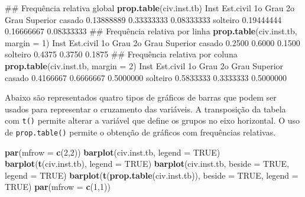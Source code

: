 \documentclass[10pt,a4paper]{book}
\newenvironment{Shaded}{\begin{snugshade}}{\end{snugshade}}
\newcommand{\KeywordTok}[1]{\textcolor[rgb]{0.13,0.29,0.53}{\textbf{#1}}}
\newcommand{\DataTypeTok}[1]{\textcolor[rgb]{0.13,0.29,0.53}{#1}}
\newcommand{\DecValTok}[1]{\textcolor[rgb]{0.00,0.00,0.81}{#1}}
\newcommand{\FloatTok}[1]{\textcolor[rgb]{0.00,0.00,0.81}{#1}}
\newcommand{\OtherTok}[1]{\textcolor[rgb]{0.56,0.35,0.01}{#1}}
\newcommand{\NormalTok}[1]{#1}
\begin{document}
\begin{Shaded}
\begin{Highlighting}[]
\NormalTok{## Frequência relativa global}
\KeywordTok{prop.table}\NormalTok{(civ.inst.tb)}
\NormalTok{          Inst}
\NormalTok{Est.civil     1o Grau    2o Grau   Superior}
\NormalTok{  casado   }\FloatTok{0.13888889} \FloatTok{0.33333333} \FloatTok{0.08333333}
\NormalTok{  solteiro }\FloatTok{0.19444444} \FloatTok{0.16666667} \FloatTok{0.08333333}
\NormalTok{## Frequência relativa por linha}
\KeywordTok{prop.table}\NormalTok{(civ.inst.tb, }\DataTypeTok{margin =} \DecValTok{1}\NormalTok{)}
\NormalTok{          Inst}
\NormalTok{Est.civil  1o Grau 2o Grau Superior}
\NormalTok{  casado    }\FloatTok{0.2500}  \FloatTok{0.6000}   \FloatTok{0.1500}
\NormalTok{  solteiro  }\FloatTok{0.4375}  \FloatTok{0.3750}   \FloatTok{0.1875}
\NormalTok{## Frequência relativa por coluna}
\KeywordTok{prop.table}\NormalTok{(civ.inst.tb, }\DataTypeTok{margin =} \DecValTok{2}\NormalTok{)}
\NormalTok{          Inst}
\NormalTok{Est.civil    1o Grau   2o Grau  Superior}
\NormalTok{  casado   }\FloatTok{0.4166667} \FloatTok{0.6666667} \FloatTok{0.5000000}
\NormalTok{  solteiro }\FloatTok{0.5833333} \FloatTok{0.3333333} \FloatTok{0.5000000}
\end{Highlighting}
\end{Shaded}

Abaixo são representados quatro tipos de gráficos de barras que podem
ser usados para representar o cruzamento das variáveis. A transposição
da tabela com \texttt{t()} permite alterar a variável que define os
grupos no eixo horizontal. O uso de \texttt{prop.table()} permite o
obtenção de gráficos com frequências relativas.

\begin{Shaded}
\begin{Highlighting}[]
\KeywordTok{par}\NormalTok{(}\DataTypeTok{mfrow =} \KeywordTok{c}\NormalTok{(}\DecValTok{2}\NormalTok{,}\DecValTok{2}\NormalTok{))}
\KeywordTok{barplot}\NormalTok{(civ.inst.tb, }\DataTypeTok{legend =} \OtherTok{TRUE}\NormalTok{)}
\KeywordTok{barplot}\NormalTok{(}\KeywordTok{t}\NormalTok{(civ.inst.tb), }\DataTypeTok{legend =} \OtherTok{TRUE}\NormalTok{)}
\KeywordTok{barplot}\NormalTok{(civ.inst.tb, }\DataTypeTok{beside =} \OtherTok{TRUE}\NormalTok{, }\DataTypeTok{legend =} \OtherTok{TRUE}\NormalTok{)}
\KeywordTok{barplot}\NormalTok{(}\KeywordTok{t}\NormalTok{(}\KeywordTok{prop.table}\NormalTok{(civ.inst.tb)), }\DataTypeTok{beside =} \OtherTok{TRUE}\NormalTok{, }\DataTypeTok{legend =} \OtherTok{TRUE}\NormalTok{)}
\KeywordTok{par}\NormalTok{(}\DataTypeTok{mfrow =} \KeywordTok{c}\NormalTok{(}\DecValTok{1}\NormalTok{,}\DecValTok{1}\NormalTok{))}
\end{Highlighting}
\end{Shaded}
\end{document}
